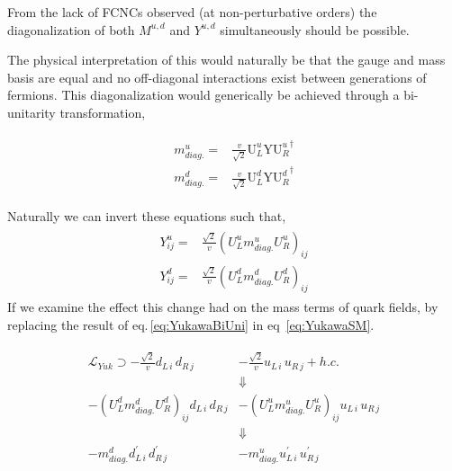 From the lack of FCNCs observed (at non-perturbative orders) the diagonalization of both $M^{u,d}$ and $Y^{u,d}$ simultaneously should be possible. {{ \color{blue} The physical interpretation of this would naturally be that the gauge and mass basis are equal } and no off-diagonal interactions exist between generations of fermions. This diagonalization would generically be achieved through a bi-unitarity transformation, 

\begin{align}
\begin{split}
m^u_{diag.}  =  & \frac{v}{\sqrt{2}} \mathrm{U}^u_L \mathrm{Y} {\mathrm{U}^u_R}^\dagger \nonumber \\ 
m^d_{diag.}  = & \frac{v}{\sqrt{2}}  \mathrm{U}^d_L \mathrm{Y} {\mathrm{U}^d_R}^\dagger 
\end{split}
\end{align}

Naturally we can invert these equations such that, 
\begin{align}
\label{eq:YukawaBiUni}
\begin{split}
Y^u_{ij} = & \frac{\sqrt{2}}{v} (U_L^u m^u_{diag.} U_R^u)_{ij} \\
Y^d_{ij} = & \frac{\sqrt{2}}{v} (U_L^d m^d_{diag.} U_R^d)_{ij}
\end{split}
\end{align}
If we examine the effect this change had on the mass terms of quark fields, by replacing the result of eq.\,\ref{eq:YukawaBiUni} in eq\, \ref{eq:YukawaSM}.

\begin{align}
\begin{split}
\mathcal{L}_{Yuk} \supset -\frac{\sqrt{2}}{v} d_{L\,i} \, d_{R\,j} & - \frac{\sqrt{2}}{v} u_{L\,i} \, u_{R\,j} + h.c. \\ 
 & \Downarrow  \\
-(U_L^d m^d_{diag.} U_R^d)_{ij} d_{L\,i} \, d_{R\,j}  &- (U_L^u m^u_{diag.} U_R^u)_{ij} u_{L\,i} \, u_{R\,j} \\ 
& \Downarrow \\ 
-m^d_{diag.} d_{L\,i}^\prime \, d_{R\,j}^\prime & - m^u_{diag.} u_{L\,i}^\prime \, u_{R\,j}^\prime
\end{split}
\end{align}

}
